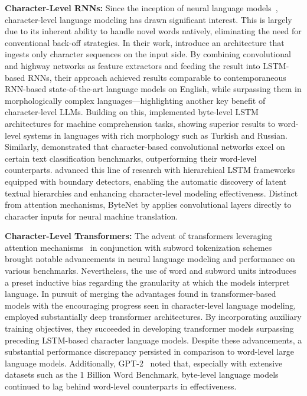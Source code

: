 \textbf{Character-Level RNNs:} Since the inception of neural language models~\citep{sutskever2011generating,mikolov2012subword,graves2013generating}, character-level language modeling has drawn significant interest. This is largely due to its inherent ability to handle novel words natively, eliminating the need for conventional back-off strategies. In their work, \cite{kim2016character} introduce an architecture that ingests only character sequences on the input side. By combining convolutional and highway networks as feature extractors and feeding the result into LSTM-based RNNs, their approach achieved results comparable to contemporaneous RNN-based state-of-the-art language models on English, while surpassing them in morphologically complex languages—highlighting another key benefit of character-level LLMs. Building on this, \cite{kenter2018byte} implemented byte-level LSTM architectures for machine comprehension tasks, showing superior results to word-level systems in languages with rich morphology such as Turkish and Russian. Similarly, \cite{zhang2015character} demonstrated that character-based convolutional networks excel on certain text classification benchmarks, outperforming their word-level counterparts. \citet{chung2019hierarchical} advanced this line of research with hierarchical LSTM frameworks equipped with boundary detectors, enabling the automatic discovery of latent textual hierarchies and enhancing character-level modeling effectiveness. Distinct from attention mechanisms, ByteNet by \cite{kalchbrenner2016neural} applies convolutional layers directly to character inputs for neural machine translation.

\textbf{Character-Level Transformers:} The advent of transformers leveraging attention mechanisms~\citep{vaswani2017attention} in conjunction with subword tokenization schemes~\citep{sennrich-etal-2016-neural} brought notable advancements in neural language modeling and performance on various benchmarks. Nevertheless, the use of word and subword units introduces a preset inductive bias regarding the granularity at which the models interpret language. In pursuit of merging the advantages found in transformer-based models with the encouraging progress seen in character-level language modeling, \citet{al2019character} employed substantially deep transformer architectures. By incorporating auxiliary training objectives, they succeeded in developing transformer models surpassing preceding LSTM-based character language models. Despite these advancements, a substantial performance discrepancy persisted in comparison to word-level large language models. Additionally, GPT-2~\citep{radfordgpt2} noted that, especially with extensive datasets such as the 1 Billion Word Benchmark, byte-level language models continued to lag behind word-level counterparts in effectiveness.

